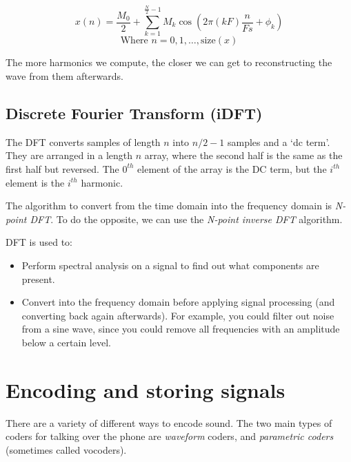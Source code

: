 \[
  x(n) = \frac{M_0}{2} + \sum\limits^{\frac{N}{2}-1}_{k=1}M_k\cos\left(2\pi (kF)\frac{n}{Fs} + \phi_k\right)
\]
\[
  \text{Where } n = 0,1,\dots,\text{size}(x)
\]

The more harmonics we compute, the closer we can get to reconstructing the wave
from them afterwards.

\subsection{Discrete Fourier Transform (iDFT)}

The DFT converts samples of length $n$ into $n/2 - 1$ samples and a `dc term'.
They are arranged in a length $n$ array, where the second half is the same as
the first half but reversed. The $0^{th}$ element of the array is the DC term,
but the $i^{th}$ element is the $i^{th}$ harmonic.

The algorithm to convert from the time domain into the frequency domain is
\textit{N-point DFT}. To do the opposite, we can use the \textit{N-point inverse
DFT} algorithm.


DFT is used to:

\begin{itemize}
  \item Perform spectral analysis on a signal to find out what components are 
    present.
  \item Convert into the frequency domain before applying signal processing (and
    converting back again afterwards). For example, you could filter out noise 
    from a sine wave, since you could remove all frequencies with an amplitude
    below a certain level.
\end{itemize}


\section{Encoding and storing signals}

There are a variety of different ways to encode sound. The two main types of
coders for talking over the phone are \textit{waveform} coders, and
\textit{parametric coders} (sometimes called vocoders).


